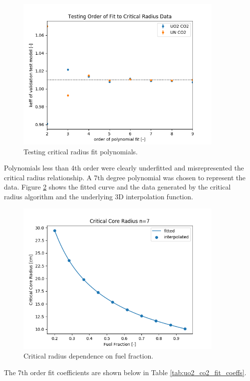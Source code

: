 \begin{figure}[h]
    \centering
    \includegraphics[width=4in]{../images/poly_order_test.png}
\caption{Testing critical radius fit polynomials.}
\label{fig:fit_order_test}
\end{figure}

Polynomials less than 4th order were clearly underfitted and misrepresented the
critical radius relationship. A 7th degree polynomial was chosen to represent the
data. Figure \ref{fig:core_r_co2_uo2} shows the fitted curve and the
data generated by the critical radius algorithm and the underlying 3D
interpolation function.

\begin{figure}[h]
    \centering
    \includegraphics[width=4in]{../images/uo2_co2_core_r.png}
\caption{Critical radius dependence on fuel fraction.}
\label{fig:core_r_co2_uo2}
\end{figure}

The 7th order fit coefficients are shown below in Table
\ref{tab:uo2_co2_fit_coeffs}.

